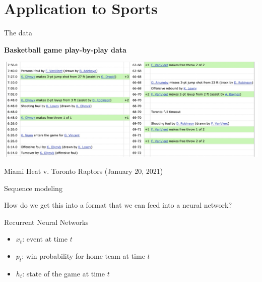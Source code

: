 \section{Application to Sports}

\begin{frame}{The data}

	\textbf{Basketball game play-by-play data}

	\medskip

	\includegraphics[width = \textwidth]{bbref-play-by-play.jpg}

	\medskip

	Miami Heat v. Toronto Raptors (January 20, 2021)
\end{frame}

\begin{frame}{Sequence modeling}

	How do we get this into a format that we can feed into a neural network?

\end{frame}

\begin{frame}[t]{Recurrent Neural Networks}
	\begin{itemize}
		\item $x_t$: event at time $t$
		\item $p_t$: win probability for home team at time $t$
		\item $h_t$: state of the game at time $t$
	\end{itemize}

	\medskip \pause

	\begin{center}
	\end{center}
\end{frame}


